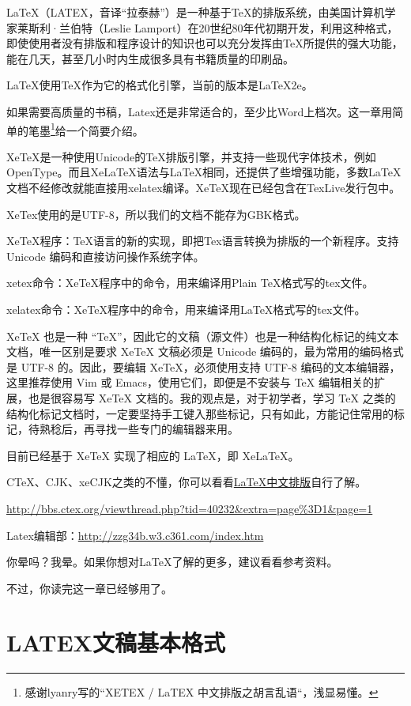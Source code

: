\documentclass[a4paper]{book}
\begin{document}
LaTeX（LATEX，音译“拉泰赫”）是一种基于TeX的排版系统，由美国计算机学家莱斯利·兰伯特（Leslie Lamport）在20世纪80年代初期开发，利用这种格式，即使使用者没有排版和程序设计的知识也可以充分发挥由TeX所提供的强大功能，能在几天，甚至几小时内生成很多具有书籍质量的印刷品。

LaTeX使用TeX作为它的格式化引擎，当前的版本是LaTeX2e。

如果需要高质量的书稿，Latex还是非常适合的，至少比Word上档次。这一章用简单的笔墨\footnote{感谢lyanry写的``XETEX / LaTEX 中文排版之胡言乱语``，浅显易懂。}给一个简要介绍。

XeTeX是一种使用Unicode的TeX排版引擎，并支持一些现代字体技术，例如OpenType。而且XeLaTeX语法与LaTeX相同，还提供了些增强功能，多数LaTeX文档不经修改就能直接用xelatex编译。XeTeX现在已经包含在TexLive发行包中。

XeTex使用的是UTF-8，所以我们的文档不能存为GBK格式。

XeTeX程序：TeX语言的新的实现，即把Tex语言转换为排版的一个新程序。支持Unicode 编码和直接访问操作系统字体。

xetex命令：XeTeX程序中的命令，用来编译用Plain TeX格式写的tex文件。

xelatex命令：XeTeX程序中的命令，用来编译用LaTeX格式写的tex文件。

XeTeX 也是一种 “TeX”，因此它的文稿（源文件）也是一种结构化标记的纯文本文档，唯一区别是要求 XeTeX 文稿必须是 Unicode 编码的，最为常用的编码格式是 UTF-8 的。因此，要编辑 XeTeX，必须使用支持 UTF-8 编码的文本编辑器，这里推荐使用 Vim 或 Emacs，使用它们，即便是不安装与 TeX 编辑相关的扩展，也是很容易写 XeTeX 文档的。我的观点是，对于初学者，学习 TeX 之类的结构化标记文档时，一定要坚持手工键入那些标记，只有如此，方能记住常用的标记，待熟稔后，再寻找一些专门的编辑器来用。

目前已经基于 XeTeX 实现了相应的 LaTeX，即 XeLaTeX。

CTeX、CJK、xeCJK之类的不懂，你可以看看\href{http://linux-wiki.cn/wiki/LaTeX\%E4\%B8\%AD\%E6\%96\%87\%E6\%8E\%92\%E7\%89\%88\%EF\%BC\%88\%E4\%BD\%BF\%E7\%94\%A8XeTeX\%EF\%BC\%89}{LaTeX中文排版}自行了解。

\url{http://bbs.ctex.org/viewthread.php?tid=40232&extra=page%3D1&page=1}

Latex编辑部：\url{http://zzg34b.w3.c361.com/index.htm}

你晕吗？我晕。如果你想对LaTeX了解的更多，建议看看参考资料。

不过，你读完这一章已经够用了。

\section{LATEX文稿基本格式}
\end{document}
